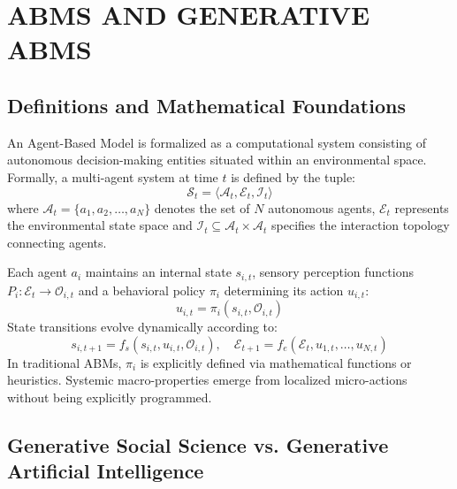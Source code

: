 \documentclass[12pt,a4paper]{report}
\begin{document}

\chapter{ABMS AND GENERATIVE ABMS}
\label{chap:abms_and_gabms}

\section{Definitions and Mathematical Foundations}
\label{sec:math_foundations}

An Agent-Based Model is formalized as a computational system consisting of autonomous decision-making entities situated within an environmental space. Formally, a multi-agent system at time $t$ is defined by the tuple:
\begin{equation}
\mathcal{S}_t = \langle \mathcal{A}_t, \mathcal{E}_t, \mathcal{I}_t \rangle
\end{equation}
where $\mathcal{A}_t = \{a_1, a_2, \dots, a_N\}$ denotes the set of $N$ autonomous agents, $\mathcal{E}_t$ represents the environmental state space and $\mathcal{I}_t \subseteq \mathcal{A}_t \times \mathcal{A}_t$ specifies the interaction topology connecting agents.

Each agent $a_i$ maintains an internal state $s_{i,t}$, sensory perception functions $P_i: \mathcal{E}_t \to \mathcal{O}_{i,t}$ and a behavioral policy $\pi_i$ determining its action $u_{i,t}$:
\begin{equation}
u_{i,t} = \pi_i(s_{i,t}, \mathcal{O}_{i,t})
\end{equation}
State transitions evolve dynamically according to:
\begin{equation}
s_{i,t+1} = f_s(s_{i,t}, u_{i,t}, \mathcal{O}_{i,t}), \quad \mathcal{E}_{t+1} = f_e(\mathcal{E}_t, u_{1,t}, \dots, u_{N,t})
\end{equation}
In traditional ABMs, $\pi_i$ is explicitly defined via mathematical functions or heuristics. Systemic macro-properties emerge from localized micro-actions without being explicitly programmed.

\section{Generative Social Science vs. Generative Artificial Intelligence}
\label{sec:epistemology}
\end{document}

